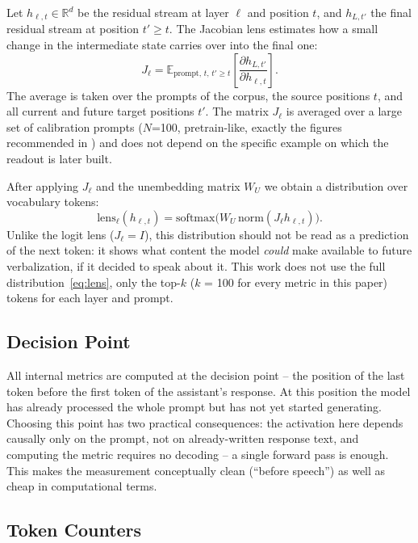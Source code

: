 \documentclass[10pt,twocolumn]{article}
\begin{document}
Let $h_{\ell,t}\in\mathbb{R}^{d}$ be the residual stream at layer $\ell$ and position $t$, and
$h_{L,t'}$ the final residual stream at position $t'\ge t$. The Jacobian lens estimates
how a small change in the intermediate state carries over into the final one:
\begin{equation}
J_\ell = \mathbb{E}_{\text{prompt},\,t,\,t'\ge t}
\left[\frac{\partial h_{L,t'}}{\partial h_{\ell,t}}\right].
\label{eq:jacobian}
\end{equation}
The average is taken over the prompts of the corpus, the source positions $t$, and all current and future target positions $t'$. The matrix $J_\ell$ is averaged over a large set of calibration prompts ($N$=100, pretrain-like, exactly the figures recommended in \citep{gurnee2026workspace}) and does not depend on the specific example on which the readout is later built.

After applying $J_\ell$
and the unembedding matrix $W_U$ we obtain a distribution over vocabulary tokens:
\begin{equation}
\mathrm{lens}_\ell(h_{\ell,t}) = \mathrm{softmax}\big(W_U\,\mathrm{norm}(J_\ell h_{\ell,t})\big).
\label{eq:lens}
\end{equation}
Unlike the logit lens \citep{nostalgebraist2020logitlens,belrose2023tunedlens} ($J_\ell=I$), this distribution should not be read as a prediction of the
next token: it shows what content the model \emph{could} make available to future verbalization, if it decided to speak about it. This work does not use the full distribution~\eqref{eq:lens}, only the top-$k$ ($k$ = 100 for every metric in this paper) tokens for each layer and prompt.

\subsection{Decision Point}

All internal metrics are computed at the decision point -- the position of the last token before
the first token of the assistant's response. At this position the model has already
processed the whole prompt but has not yet started generating. Choosing this point has two practical
consequences: the activation here depends causally only on the prompt, not on already-written
response text, and computing the metric requires no decoding -- a single forward pass is
enough. This makes the measurement conceptually clean (``before speech'') as well as cheap
in computational terms.

\subsection{Token Counters}
\end{document}
